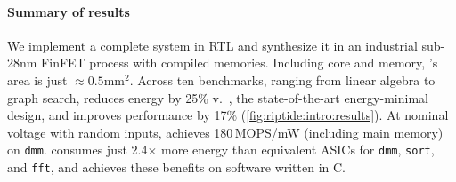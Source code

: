   
  
  

\figRipTideIntroResults
\paragraph{Summary of results}
%
We implement a complete \riptide system in RTL and synthesize it in an industrial sub-28nm FinFET process with compiled memories.
%
Including core and memory, \riptide's area is just $\approx 0.5$mm$^2$.
%
Across ten benchmarks,
ranging from linear algebra to graph search, %
\riptide reduces energy by 25\% v.\ \snafu, the state-of-the-art energy-minimal design,
and improves performance by 17\% (\autoref{fig:riptide:intro:results}).
%
At nominal voltage with random inputs, \riptide achieves 180\,MOPS/mW (including main memory) on {\tt dmm}.
%
\riptide consumes just 2.4$\times$ more energy
than equivalent ASICs for {\tt dmm}, {\tt sort}, and {\tt fft},
%
and \riptide achieves these benefits on software written in C.

